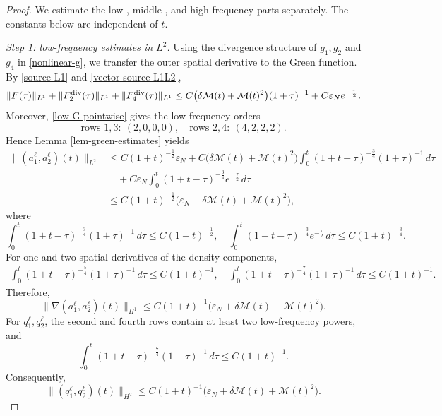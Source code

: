 \documentclass[10pt,reqno]{amsart}
\numberwithin{equation}{section}
\begin{document}
\begin{proof}
We estimate the low-, middle-, and high-frequency parts separately.  The constants below are independent of $t$.


\medskip
\noindent\emph{Step 1: low-frequency estimates in $L^2$.} Using the divergence structure of $g_1,g_2$ and $g_4$ in
\eqref{nonlinear-g}, we transfer the outer spatial derivative to the
Green function.
By \eqref{source-L1} and \eqref{vector-source-L1L2},
\begin{align*}
\|F(\tau)\|_{L^1} +\|F_2^{\rm div}(\tau)\|_{L^1} +\|F_4^{\rm div}(\tau)\|_{L^1} \le C\big(\delta\mathcal M(t)+\mathcal M(t)^2\big)(1+\tau)^{-1} +C\varepsilon_Ne^{-\frac{\tau}{2}}.
\end{align*}
Moreover, \eqref{low-G-pointwise} gives the low-frequency orders
\[
\text{rows }1,3:\ (2,0,0,0),
\quad
\text{rows }2,4:\ (4,2,2,2).
\]
Hence Lemma \ref{lem-green-estimates} yields
\begin{align*}
\|(a_1^\ell,a_2^\ell)(t)\|_{L^2} &\le C(1+t)^{-\frac12}\varepsilon_N +C\big(\delta\mathcal M(t)+\mathcal M(t)^2\big) \int_0^t(1+t-\tau)^{-\frac34}(1+\tau)^{-1}\,d\tau\\
&\quad+C\varepsilon_N \int_0^t(1+t-\tau)^{-\frac34}e^{-\frac{\tau}{2}}\,d\tau\\
&\le C(1+t)^{-\frac12} \big(\varepsilon_N+\delta\mathcal M(t)+\mathcal M(t)^2\big),
\end{align*}
where
\[
\int_0^t(1+t-\tau)^{-\frac34}(1+\tau)^{-1}\,d\tau
\le C(1+t)^{-\frac12},
\quad
\int_0^t(1+t-\tau)^{-\frac34}e^{-\frac{\tau}{2}}\,d\tau
\le C(1+t)^{-\frac34}.
\]
For one and two spatial derivatives of the density components,
\begin{align*}
\int_0^t(1+t-\tau)^{-\frac54}(1+\tau)^{-1}\,d\tau  \le C(1+t)^{-1},\quad \int_0^t(1+t-\tau)^{-\frac74}(1+\tau)^{-1}\,d\tau \le C(1+t)^{-1}.
\end{align*}
Therefore,
\[%
\|\nabla(a_1^\ell,a_2^\ell)(t)\|_{H^1}
\le C(1+t)^{-1}
\big(\varepsilon_N+\delta\mathcal M(t)+\mathcal M(t)^2\big).
\]%
For $q_1^\ell,q_2^\ell$, the second and fourth rows contain at least two low-frequency powers, and
\[
\int_0^t(1+t-\tau)^{-\frac74}(1+\tau)^{-1}\,d\tau
\le C(1+t)^{-1}.
\]
Consequently,
\[%
\|(q_1^\ell,q_2^\ell)(t)\|_{H^2}
\le C(1+t)^{-1}
\big(\varepsilon_N+\delta\mathcal M(t)+\mathcal M(t)^2\big).
\]%



\end{proof}
\end{document}
